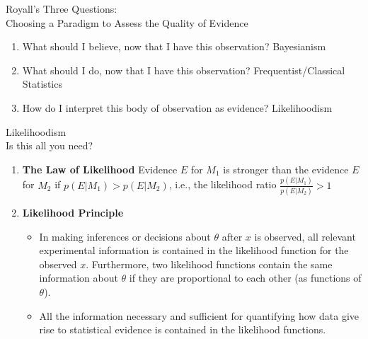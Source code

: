 \documentclass{beamer}
\begin{document}
\begin{frame}{Royall's Three Questions: \\
 Choosing a Paradigm to Assess the Quality of Evidence}
	\begin{enumerate}
		\item What should I believe, now that I have this observation? \alert{Bayesianism}
\vfill
		\item What should I do, now that I have this observation? \alert{Frequentist/Classical Statistics}
\vfill
		\item How do I interpret this body of observation as evidence? \alert{Likelihoodism}
	\end{enumerate}
\end{frame}

	\begin{frame}{Likelihoodism\\ Is this all you need?}
        \begin{enumerate}
        \item \textbf{The Law of Likelihood}
        \vfill
        Evidence $E$ for $M_{1}$ is stronger than the evidence $E$ for $M_{2}$ if $p(E| M_{1}) > p(E | M_{2})$, i.e., the likelihood ratio $\frac{p(E|M_{1})}{p(E|M_{2})}>1$
        
        \vfill
        
        \item \textbf{Likelihood Principle}
        \vfill
\begin{itemize}
\item  In making inferences or decisions about $\theta$ after $x$ is observed, all relevant experimental information is contained in the likelihood function for the observed $x$. Furthermore, two likelihood functions contain the same information about $\theta$ if they are proportional to each other (as functions
of $\theta$).
\vfill
\item All the information necessary and sufficient for quantifying how data give rise to statistical evidence is contained in the likelihood functions.
\end{itemize}
        \end{enumerate}
	\end{frame}
    
\end{document}
